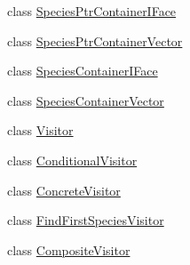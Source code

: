 \begin{DoxyCompactItemize}
class \hyperlink{classchem_1_1SpeciesPtrContainerIFace}{Species\-Ptr\-Container\-I\-Face}
\item 
class \hyperlink{classchem_1_1SpeciesPtrContainerVector}{Species\-Ptr\-Container\-Vector}
\item 
class \hyperlink{classchem_1_1SpeciesContainerIFace}{Species\-Container\-I\-Face}
\item 
class \hyperlink{classchem_1_1SpeciesContainerVector}{Species\-Container\-Vector}
\item 
class \hyperlink{classchem_1_1Visitor}{Visitor}
\item 
class \hyperlink{classchem_1_1ConditionalVisitor}{Conditional\-Visitor}
\item 
class \hyperlink{classchem_1_1ConcreteVisitor}{Concrete\-Visitor}
\item 
class \hyperlink{classchem_1_1FindFirstSpeciesVisitor}{Find\-First\-Species\-Visitor}
\item 
class \hyperlink{classchem_1_1CompositeVisitor}{Composite\-Visitor}
\end{DoxyCompactItemize}
